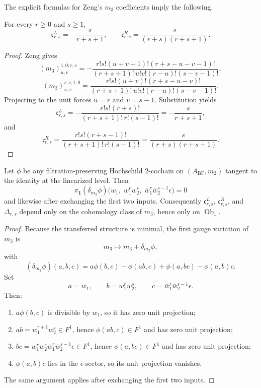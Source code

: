 The explicit formulas for Zeng's $m_3$ coefficients imply the following.

\begin{proposition}
For every $r\ge0$ and $s\ge1$,
\[
\mathfrak c^L_{r,s}=-\frac{s}{r+s+1},
\qquad
\mathfrak c^R_{r,s}=\frac{s}{(r+s)(r+s+1)}.
\]
\end{proposition}

\begin{proof}
Zeng gives
\[
(m_3)^{1,0;r,s}_{u,v}
= - \frac{r!s!(u+v+1)!(r+s-u-v-1)!}{(r+s+1)!\,u!v!(r-u)!(s-v-1)!},
\]
\[
(m_3)^{r,s;1,0}_{u,v}
= \frac{r!s!(u+v)!(r+s-u-v)!}{(r+s+1)!\,u!v!(r-u)!(s-v-1)!}.
\]
Projecting to the unit forces $u=r$ and $v=s-1$. Substitution yields
\[
\mathfrak c^L_{r,s}=-\frac{r!s!(r+s)!}{(r+s+1)!\,r!(s-1)!}
=-\frac{s}{r+s+1},
\]
and
\[
\mathfrak c^R_{r,s}=\frac{r!s!(r+s-1)!}{(r+s+1)!\,r!(s-1)!}
=\frac{s}{(r+s)(r+s+1)}.
\]
\end{proof}

\begin{theorem}
Let $\phi$ be any filtration-preserving Hochschild $2$-cochain on $(A_{\mathrm{BF}},m_2)$ tangent to the identity at the linearized level. Then
\[
\pi_{\mathbf 1}(\delta_{m_2}\phi)
\bigl(w_1,\;w_1^rw_2^s,\;\bar w_1^r\bar w_2^{s-1}\epsilon\bigr)=0
\]
and likewise after exchanging the first two inputs. Consequently $\mathfrak c^L_{r,s}$, $\mathfrak c^R_{r,s}$, and $\Delta_{r,s}$ depend only on the cohomology class of $m_3$, hence only on $\operatorname{Ob}_1$.
\end{theorem}

\begin{proof}
Because the transferred structure is minimal, the first gauge variation of $m_3$ is
\[
m_3\mapsto m_3+\delta_{m_2}\phi,
\]
with
\[
(\delta_{m_2}\phi)(a,b,c)
=
a\phi(b,c)-\phi(ab,c)+\phi(a,bc)-\phi(a,b)c.
\]
Set
\[
a=w_1,\qquad
b=w_1^rw_2^s,\qquad
c=\bar w_1^r\bar w_2^{s-1}\epsilon.
\]
Then:
\begin{enumerate}[label=\textup{(\arabic*)},leftmargin=2em]
\item $a\phi(b,c)$ is divisible by $w_1$, so it has zero unit projection;
\item $ab=w_1^{r+1}w_2^s\in F^1$, hence $\phi(ab,c)\in F^1$ and has zero unit projection;
\item $bc=w_1^rw_2^s\bar w_1^r\bar w_2^{s-1}\epsilon\in F^1$, hence $\phi(a,bc)\in F^1$ and has zero unit projection;
\item $\phi(a,b)c$ lies in the $\epsilon$-sector, so its unit projection vanishes.
\end{enumerate}
The same argument applies after exchanging the first two inputs.
\end{proof}


